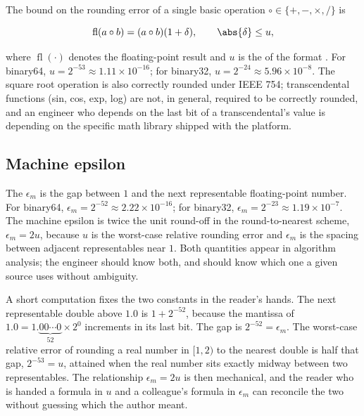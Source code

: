 The bound on the rounding error of a single basic operation $\circ
\in \{+, -, \times, /\}$ is

\[
\operatorname{fl}(a \circ b) = (a \circ b)(1 + \delta), \qquad \abs{\delta} \leq u,
\]

where $\operatorname{fl}(\cdot)$ denotes the floating-point result and $u$ is the
 of the format \cite[\S2.2]{text:higham-numerical}.
For binary64, $u = 2^{-53} \approx 1.11 \times 10^{-16}$; for
binary32, $u = 2^{-24} \approx 5.96 \times 10^{-8}$. The square root
operation is also correctly rounded under IEEE 754; transcendental
functions (sin, cos, exp, log) are not, in general, required to be
correctly rounded, and an engineer who depends on the last bit of a
transcendental's value is depending on the specific math library
shipped with the platform.

\subsection{Machine epsilon}

The  $\epsilon_{m}$ is the gap between
$1$ and the next representable floating-point number. For binary64,
$\epsilon_{m} = 2^{-52} \approx 2.22 \times 10^{-16}$; for binary32,
$\epsilon_{m} = 2^{-23} \approx 1.19 \times 10^{-7}$. The machine
epsilon is twice the unit round-off in the round-to-nearest scheme,
$\epsilon_{m} = 2 u$, because $u$ is the worst-case relative
rounding error and $\epsilon_{m}$ is the spacing between adjacent
representables near $1$. Both quantities appear in algorithm
analysis; the engineer should know both, and should know which one
a given source uses without ambiguity.

A short computation fixes the two constants in the reader's hands.
The next representable double above $1.0$ is $1 + 2^{-52}$, because
the mantissa of $1.0 = 1.\underbrace{00\cdots0}_{52}\times 2^{0}$
increments in its last bit. The gap is $2^{-52} = \epsilon_{m}$. The
worst-case relative error of rounding a real number in $[1, 2)$ to
the nearest double is half that gap, $2^{-53} = u$, attained when the
real number sits exactly midway between two representables. The
relationship $\epsilon_{m} = 2u$ is then mechanical, and the reader
who is handed a formula in $u$ and a colleague's formula in
$\epsilon_{m}$ can reconcile the two without guessing which the
author meant.

